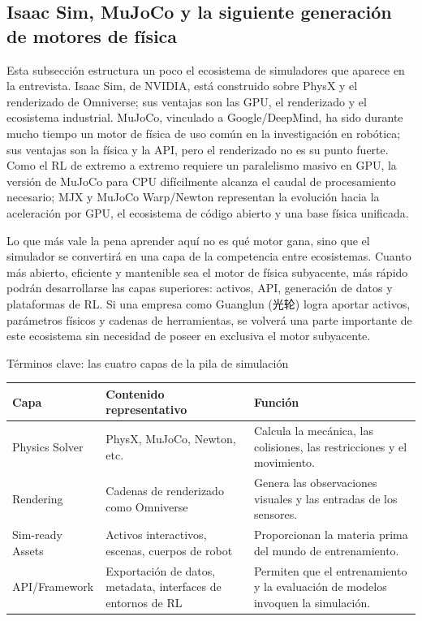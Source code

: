 \subsection{Isaac Sim, MuJoCo y la siguiente generación de motores de física}

Esta subsección estructura un poco el ecosistema de simuladores que aparece en la entrevista. Isaac Sim, de NVIDIA, está construido sobre PhysX y el renderizado de Omniverse; sus ventajas son las GPU, el renderizado y el ecosistema industrial. MuJoCo, vinculado a Google/DeepMind, ha sido durante mucho tiempo un motor de física de uso común en la investigación en robótica; sus ventajas son la física y la API, pero el renderizado no es su punto fuerte. Como el RL de extremo a extremo requiere un paralelismo masivo en GPU, la versión de MuJoCo para CPU difícilmente alcanza el caudal de procesamiento necesario; MJX y MuJoCo Warp/Newton representan la evolución hacia la aceleración por GPU, el ecosistema de código abierto y una base física unificada.

Lo que más vale la pena aprender aquí no es qué motor gana, sino que el simulador se convertirá en una capa de la competencia entre ecosistemas. Cuanto más abierto, eficiente y mantenible sea el motor de física subyacente, más rápido podrán desarrollarse las capas superiores: activos, API, generación de datos y plataformas de RL. Si una empresa como Guanglun (光轮) logra aportar activos, parámetros físicos y cadenas de herramientas, se volverá una parte importante de este ecosistema sin necesidad de poseer en exclusiva el motor subyacente.

\begin{knowledgebox}{Términos clave: las cuatro capas de la pila de simulación}
\begin{tabularx}{\textwidth}{p{}p{}X}
\toprule
Capa & Contenido representativo & Función \\
\midrule
Physics Solver & PhysX, MuJoCo, Newton, etc. & Calcula la mecánica, las colisiones, las restricciones y el movimiento. \\
Rendering & Cadenas de renderizado como Omniverse & Genera las observaciones visuales y las entradas de los sensores. \\
Sim-ready Assets & Activos interactivos, escenas, cuerpos de robot & Proporcionan la materia prima del mundo de entrenamiento. \\
API/Framework & Exportación de datos, metadata, interfaces de entornos de RL & Permiten que el entrenamiento y la evaluación de modelos invoquen la simulación. \\
\bottomrule
\end{tabularx}
\end{knowledgebox}

